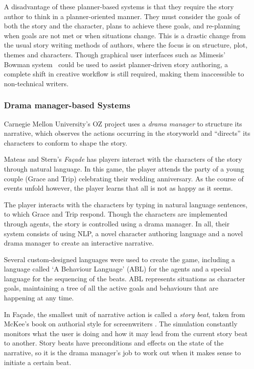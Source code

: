 A disadvantage of these planner-based systems is that they require the story author to think in a planner-oriented manner. They must consider the goals of both the story and the character, plans to achieve these goals, and re-planning when goals are not met or when situations change. This is a drastic change from the usual story writing methods of authors, where the focus is on structure, plot, themes and characters. Though graphical user interfaces such as Mimesis' Bowman system~\cite{thomas2006author} could be used to assist planner-driven story authoring, a complete shift in creative workflow is still required, making them inaccessible to non-technical writers.

\subsubsection{Drama manager-based Systems}

Carnegie Mellon University's OZ project \cite{mateas1999oz} uses a \emph{drama manager} to structure its narrative, which observes the actions occurring in the storyworld and ``directs'' its characters to conform to shape the story. 

Mateas and Stern's \emph{Fa\c{c}ade} has players interact with the characters of the story through natural language. In this game, the player attends the party of a young couple (Grace and Trip) celebrating their wedding anniversary. As the course of events unfold however, the player learns that all is not as happy as it seems.

The player interacts with the characters by typing in natural language sentences, to which Grace and Trip respond. Though the characters are implemented through agents, the story is controlled using a drama manager. In all, their system consists of using NLP, a novel character authoring language and a novel drama manager to create an interactive narrative.

Several custom-designed languages were used to create the game, including a language called `A Behaviour Language' (ABL) for the agents and a special language for the sequencing of the beats. ABL represents situations as character goals, maintaining a tree of all the active goals and behaviours that are happening at any time.

In Fa\c{c}ade, the smallest unit of narrative action is called a \emph{story beat}, taken from McKee's book on authorial style for screenwriters \citep{mckee1997substance}. The simulation constantly monitors what the user is doing and how it may lead from the current story beat to another. Story beats have preconditions and effects on the state of the narrative, so it is the drama manager's job to work out when it makes sense to initiate a certain beat.

